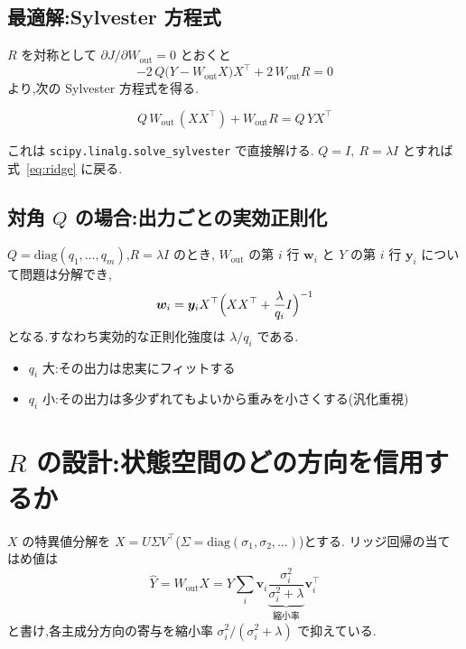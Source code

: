 \documentclass[a4paper,11pt]{ltjsarticle}
\newcommand{\Wout}{W_{\mathrm{out}}}
\newcommand{\T}{^{\top}}
\begin{document}
\subsection{最適解:Sylvester 方程式}

$R$ を対称として $\partial J / \partial \Wout = 0$ とおくと
\begin{equation}
  -2\,Q\bigl(Y - \Wout X\bigr)X\T + 2\,\Wout R = 0
\end{equation}
より,次の Sylvester 方程式を得る.

\begin{keybox}[title=最適リードアウトの条件]
\begin{equation}
  Q\,\Wout\,(X X\T) + \Wout R = Q\, Y X\T
  \label{eq:sylvester}
\end{equation}
\end{keybox}

これは \texttt{scipy.linalg.solve\_sylvester} で直接解ける.
$Q = I,\ R = \lambda I$ とすれば式~\eqref{eq:ridge} に戻る.

\subsection{対角 $Q$ の場合:出力ごとの実効正則化}

$Q = \mathrm{diag}(q_1,\dots,q_m)$,$R = \lambda I$ のとき,
$\Wout$ の第 $i$ 行 $\bm{w}_i$ と $Y$ の第 $i$ 行 $\bm{y}_i$ について問題は分解でき,
\begin{equation}
  \bm{w}_i = \bm{y}_i X\T \Bigl(X X\T + \frac{\lambda}{q_i} I\Bigr)^{-1}
\end{equation}
となる.すなわち実効的な正則化強度は $\lambda / q_i$ である.

\begin{itemize}
  \item $q_i$ 大:その出力は忠実にフィットする
  \item $q_i$ 小:その出力は多少ずれてもよいから重みを小さくする(汎化重視)
\end{itemize}

\section{$R$ の設計:状態空間のどの方向を信用するか}

$X$ の特異値分解を $X = U \Sigma V\T$($\Sigma = \mathrm{diag}(\sigma_1,\sigma_2,\dots)$)とする.
リッジ回帰の当てはめ値は
\begin{equation}
  \hat{Y} = \Wout X = Y \sum_i \bm{v}_i
    \underbrace{\frac{\sigma_i^2}{\sigma_i^2 + \lambda}}_{\text{縮小率}} \bm{v}_i\T
\end{equation}
と書け,各主成分方向の寄与を縮小率 $\sigma_i^2/(\sigma_i^2+\lambda)$ で抑えている.
\end{document}
